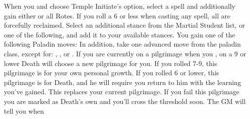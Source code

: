 \documentclass[darkmode]{dw_playbook}
\begin{document}
\begin{minipage}[t]{0.9\textwidth}
\begin{minipage}[t]{0.65\textwidth}
        \begin{multicols*}{2}
                {
                When you  and choose Temple Initiate's option, select a spell and additionally gain either  or all Rotes.  If you roll a 6 or less when casting any spell, all are forcefully reclaimed.}
            \vgap
                {
                Select an additional stance from the Martial Student list, or one of the following, and add it to your available stances.
                \vsgap
                \vsgap
                \vsgap
                }
            \vgap
                {
                You gain one of the following Paladin moves:
                \vsgap
                \vsgap
                \vsgap
                In addition, take one advanced move from the paladin class, except for: , , or .}
            \vgap
                {If you are currently on a pilgrimage when you , on a 9 or lower Death will choose a new pilgrimage for you.  If you rolled 7-9, this pilgrimage is for your own personal growth.  If you rolled 6 or lower, this pilgrimage is for Death, and he will require you return to him with the learning you’ve gained.  This replaces your current pilgrimage.  If you fail this pilgrimage you are marked as Death’s own and you’ll cross the threshold soon.  The GM will tell you when}
        \end{multicols*}
    \end{minipage}
\end{minipage}
\begin{minipage}[t]{0.05\textwidth}
    ~ %
\end{minipage}

\end{document}
